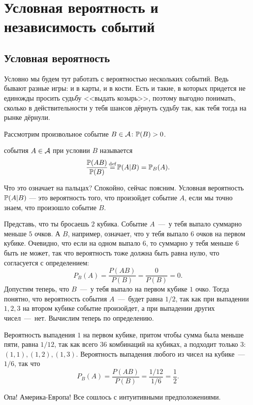 \documentclass[../TV&MS.tex]{subfiles}
\begin{document}
\section{Условная вероятность и независимость событий}

\subsection{Условная вероятность}

\qquad Условно мы будем тут работать с вероятностью нескольких событий.
Ведь бывают разные игры: и в карты, и в кости. Есть и такие, в которых
придется не единожды просить судьбу <<выдать козырь>>, поэтому выгодно
понимать, сколько в действительности у тебя шансов дёрнуть судьбу так, 
как тебя тогда на рынке дёрнули.

Рассмотрим произвольное событие $B \in \mathcal{A} \colon \mathbb{P}(B) > 0$.
\begin{Def}
 события $A \in \mathcal{A}$ при условии $B$ называется 
$$\frac{\Pro(AB)}{\Pro(B)} \myeq \Pro(A|B) = \Pro_B(A).$$
\end{Def}

Что это означает на пальцах? Спокойно, сейчас поясним. Условная вероятность 
$\mathbb{P}(A|B)$ --- это вероятность того, что произойдет событие $A$, если мы точно знаем, 
что произошло событие $B$.

\begin{Ex}
	Представь, что ты бросаешь $2$ кубика. Событие $A$~---~у тебя выпало суммарно меньше
	$5$ очков. А $B$, например, означает, что у тебя выпало $6$ очков на первом кубике.
	Очевидно, что если на одном выпало $6$, то суммарно у тебя меньше $6$ быть не может,
	так что вероятность тоже должна быть равна нулю, что согласуется с определением:
	$$P_B(A)= \frac{P(AB)}{P(B)}= \frac{0}{P(B)}=0.$$
	Допустим теперь, что $B$~---~у тебя выпало на первом кубике $1$ очко. Тогда понятно, что
	вероятность события $A$~---~будет равна $1/2$, так как при выпадении $1,2,3$ на втором кубике
	событие произойдет, а при выпадении других чисел~---~нет. Вычислим теперь по определению.
	
	Вероятность выпадения $1$ на первом кубике, притом чтобы сумма была меньше пяти, равна
	$1/12$, так как всего $36$ комбинаций на кубиках, а подходит только $3$: $(1,1), (1,2), (1,3)$.
	Вероятность выпадения любого из чисел на кубике~---~$1/6$, так что
	$$P_B(A)= \frac{P(AB)}{P(B)}= \frac{1/12}{1/6}=\frac12.$$
	
	\noindent
	Опа! Америка-Европа! Все сошлось с интуитивными предположениями.	
\end{Ex}
\end{document}
